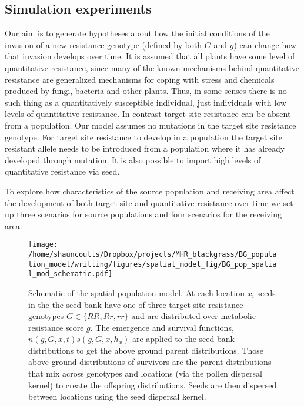 \documentclass[12pt, a4paper]{article}
\begin{document}
\subsection*{Simulation experiments}
Our aim is to generate hypotheses about how the initial conditions of the invasion of a new resistance genotype (defined by both $G$ and $g$) can change how that invasion develops over time. It is assumed that all plants have some level of quantitative resistance, since many of the known mechanisms behind quantitative resistance are generalized mechanisms for coping with stress and chemicals produced by fungi, bacteria and other plants. Thus, in some senses there is no such thing as a quantitatively susceptible individual, just individuals with low levels of quantitative resistance. In contrast target site resistance can be absent from a population. Our model assumes no mutations in the target site resistance genotype. For target site resistance to develop in a population the target site resistant allele needs to be introduced from a population where it has already developed through mutation. It is also possible to import high levels of quantitative resistance via seed. 

To explore how characteristics of the source population and receiving area affect the development of both target site and quantitative resistance over time we set up three scenarios for source populations and four scenarios for the receiving area.        



 


\begin{figure}[htbp] \label{fig:schematic}
	\texttt{[image: /home/shauncoutts/Dropbox/projects/MHR\_blackgrass/BG\_population\_model/writting/figures/spatial\_model\_fig/BG\_pop\_spatial\_mod\_schematic.pdf]}
\caption{Schematic of the spatial population model. At each location $x_i$ seeds in the the seed bank have one of three target site resistance genotypes $G \in \{RR, Rr, rr\}$ and are distributed over metabolic resistance score $g$. The emergence and survival functions, $n(g, G, x, t)s(g, G, x, h_x)$ are applied to the seed bank distributions to get the above ground parent distributions. Those above ground distributions of survivors are the parent distributions that mix across genotypes and locations (via the pollen dispersal kernel) to create the offspring distributions. Seeds are then dispersed between locations using the seed dispersal kernel.}
\end{figure}
\end{document}
